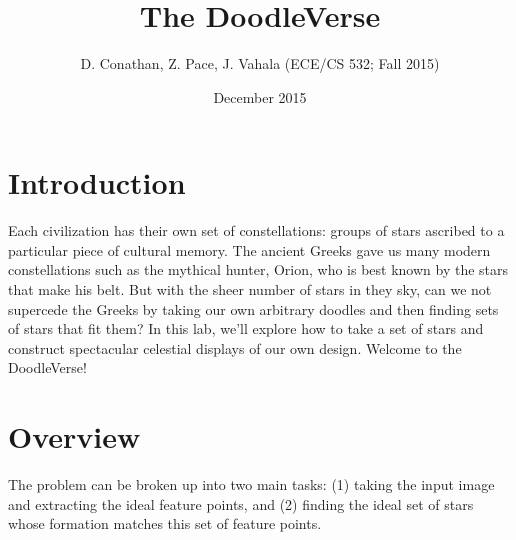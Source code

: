 \documentclass[paper=a4, fontsize=11pt]{scrartcl} %
\title{
\normalfont \normalsize
\huge The DoodleVerse \\ %
}
\author{D. Conathan, Z. Pace, J. Vahala (ECE/CS 532; Fall 2015)}
\date{December 2015}
\begin{document}
\maketitle


\begin{figure}[!h]
\captionsetup{labelformat=empty}
\caption{}
\end{figure}

\section{Introduction}

Each civilization has their own set of constellations: groups of stars ascribed to a particular piece of cultural
memory. The ancient Greeks gave us many modern constellations such as the mythical hunter, Orion, who is best known by the stars that make his belt. But with the sheer number of stars in they sky, can we not supercede the Greeks by taking our own arbitrary doodles and then finding sets of stars that fit them? In this lab, we’ll explore how to take a set of stars and construct spectacular celestial displays of our own design. Welcome to the DoodleVerse!

\section{Overview}

The problem can be broken up into two main tasks: (1) taking the input image and extracting the ideal feature points, and (2) finding the ideal set of stars whose formation matches this set of feature points.
\end{document}
